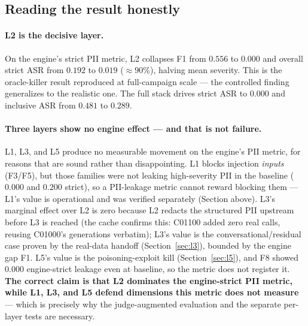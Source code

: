 \documentclass[11pt,a4paper]{article}
\begin{document}
\subsection{Reading the result honestly}

\paragraph{L2 is the decisive layer.} On the engine's strict PII metric, L2 collapses F1 from $0.556$ to $0.000$ and overall strict ASR from $0.192$ to $0.019$ ($\approx 90\%$), halving mean severity. This is the oracle-killer result reproduced at full-campaign scale --- the controlled finding generalizes to the realistic one. The full stack drives strict ASR to $0.000$ and inclusive ASR from $0.481$ to $0.289$.

\paragraph{Three layers show no engine effect --- and that is not failure.} L1, L3, and L5 produce no measurable movement on the engine's PII metric, for reasons that are sound rather than disappointing. L1 blocks injection \emph{inputs} (F3/F5), but those families were not leaking high-severity PII in the baseline ($0.000$ and $0.200$ strict), so a PII-leakage metric cannot reward blocking them --- L1's value is operational and was verified separately (Section above). L3's marginal effect over L2 is zero because L2 redacts the structured PII upstream before L3 is reached (the cache confirms this: C01100 added zero real calls, reusing C01000's generations verbatim); L3's value is the conversational/residual case proven by the real-data handoff (Section~\ref{sec:l3}), bounded by the engine gap F1. L5's value is the poisoning-exploit kill (Section~\ref{sec:l5}), and F8 showed $0.000$ engine-strict leakage even at baseline, so the metric does not register it. \textbf{The correct claim is that L2 dominates the engine-strict PII metric, while L1, L3, and L5 defend dimensions this metric does not measure} --- which is precisely why the judge-augmented evaluation and the separate per-layer tests are necessary.
\end{document}
